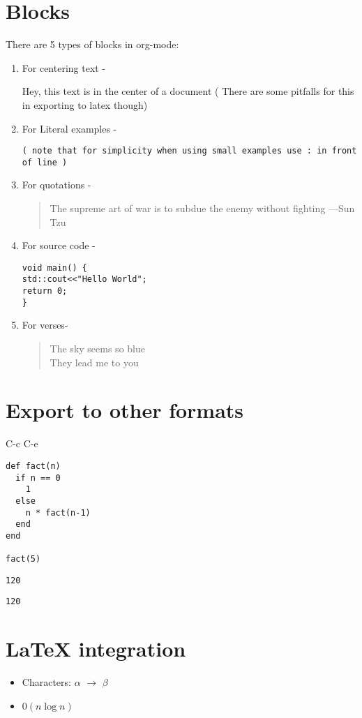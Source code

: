 \documentclass[11pt]{article}
\begin{document}
\section{Blocks}
\label{sec:org5e7901a}
There are 5 types of blocks in org-mode:
\begin{enumerate}
\item For centering text -
\begin{center}
Hey, this text is in the center of a document ( There are some pitfalls for this in exporting to latex though)
\end{center}
\item For Literal examples -
\begin{verbatim}
( note that for simplicity when using small examples use : in front of line )
\end{verbatim}
\item For quotations -
\begin{quote}
The supreme art of war is to subdue the enemy without fighting ---Sun Tzu
\end{quote}
\item For source code -
\begin{verbatim}
void main() {
std::cout<<"Hello World";
return 0;
}
\end{verbatim}
\item For verses-
\begin{verse}
The sky seems so blue\\
They lead me to you\\
\end{verse}
\end{enumerate}
\section{Export to other formats}
\label{sec:org0b438e9}
C-c C-e

\begin{verbatim}
def fact(n)
  if n == 0
    1
  else
    n * fact(n-1)
  end
end

fact(5)
\end{verbatim}

\begin{verbatim}
120
\end{verbatim}

\begin{verbatim}
120
\end{verbatim}
\section{\LaTeX{} integration}
\label{sec:org9185a78}
\begin{itemize}
\item Characters: \(\alpha\) \(\rightarrow\) \(\beta\)
\item \(0(n \log n)\)
\end{itemize}
\end{document}
